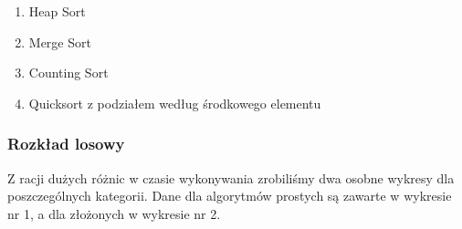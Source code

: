 \documentclass{article}
\begin{document}
\begin{enumerate}
    \item Heap Sort
    \item Merge Sort
    \item Counting Sort
    \item Quicksort z podziałem według środkowego elementu
\end{enumerate}

\newpage

\subsubsection{Rozkład losowy}

Z racji dużych różnic w czasie wykonywania zrobiliśmy dwa osobne wykresy dla poszczególnych kategorii. Dane dla algorytmów prostych są zawarte w wykresie nr 1, a dla złożonych w wykresie nr 2.
\end{document}
